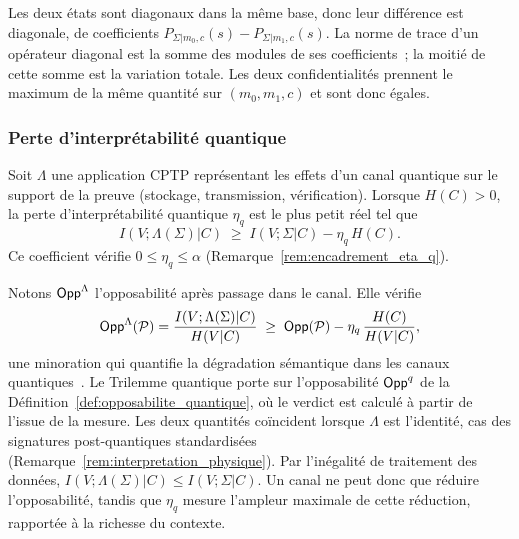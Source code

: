 \begin{sloppypar}
\begin{Preuve}
Les deux \'etats sont diagonaux dans la m\^eme base, donc leur diff\'erence est
diagonale, de coefficients $P_{\Sigma|m_0,c}(s) - P_{\Sigma|m_1,c}(s)$. La norme de
trace d'un op\'erateur diagonal est la somme des modules de ses coefficients~;
la moiti\'e de cette somme est la variation totale. Les deux confidentialit\'es
prennent le maximum de la m\^eme quantit\'e sur $(m_0,m_1,c)$ et sont donc \'egales.
\end{Preuve}

\subsubsection{Perte d'interpr\'etabilit\'e quantique}
\label{subsubsec:perte_interpretabilite}

\begin{definition}\label{def:perte_interp_quantique}
Soit $\Lambda$ une application CPTP repr\'esentant les effets d'un canal
quantique sur le support de la preuve (stockage, transmission,
v\'erification). Lorsque $H(C) > 0$, la perte d'interpr\'etabilit\'e quantique $\eta_q$
est le plus petit r\'eel tel que
\begin{equation}
I(V;\Lambda(\Sigma)|C) \;\geq\; I(V;\Sigma|C) - \eta_q\, H(C).
\label{eq:def_eta_q}
\end{equation}
Ce coefficient v\'erifie $0 \leq \eta_q \leq \alpha$
(Remarque~\ref{rem:encadrement_eta_q}).
\end{definition}

Notons $\mathsf{Opp}^{\Lambda}$ l'opposabilit\'e apr\`es passage dans le canal. Elle v\'erifie
\begin{equation}
\mathsf{Opp}^{\Lambda}(\mathcal{P}) = \frac{I(V;\Lambda(\Sigma)|C)}{H(V|C)} \;\geq\; \mathsf{Opp}(\mathcal{P}) - \eta_q\,\frac{H(C)}{H(V|C)},
\label{eq:opp_q}
\end{equation}
une minoration qui quantifie la d\'egradation s\'emantique dans les canaux
quantiques~\cite{Holevo1973,Wilde2017}. Le Trilemme quantique porte sur
l'opposabilit\'e $\mathsf{Opp}^q$ de la D\'efinition~\ref{def:opposabilite_quantique}, o\`u le
verdict est calcul\'e \`a partir de l'issue de la mesure. Les deux quantit\'es
co\"incident lorsque $\Lambda$ est l'identit\'e, cas des signatures post-quantiques
standardis\'ees (Remarque~\ref{rem:interpretation_physique}). Par l'in\'egalit\'e de traitement des
donn\'ees, $I(V;\Lambda(\Sigma)|C) \leq I(V;\Sigma|C)$. Un canal ne peut donc que
r\'eduire l'opposabilit\'e, tandis que $\eta_q$ mesure l'ampleur maximale de cette
r\'eduction, rapport\'ee \`a la richesse du contexte.


\end{sloppypar}
